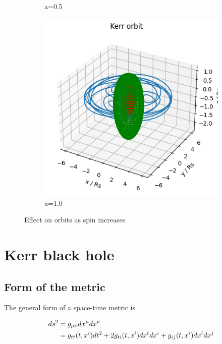 \documentclass{article}
\begin{document}
\begin{figure}[h]
\begin{subfigure}[b]{0.3\textwidth}
         \caption{a=0.5}
         \label{fig:Kerr orbit, a=0.5}
     \end{subfigure}
     \hfill
     \begin{subfigure}[b]{0.3\textwidth}
         \centering
         \includegraphics[width=\textwidth]{images/kerr_a=1.png}
         \caption{a=1.0}
         \label{fig:Kerr orbit, a=1.0}
     \end{subfigure}
        \caption{Effect on orbits as spin increases}
        \label{fig:Effect of spin on orbit}
\end{figure}


\section{Kerr black hole}\label{sec:Kerr BH}

\subsection{Form of the metric}

The general form of a space-time metric is

\begin{alignat}{1}
    ds^2&=g_{\mu \nu} dx^{\mu} dx^{\nu}\notag\\
    &=g_{tt}(t,x^i) dt^2 + 2 g_{ti}(t, x^i) dx^t dx^i + g_{ij}(t, x^i) dx^i dx^j
\label{eq:general form of metric}
\end{alignat}
\end{document}
